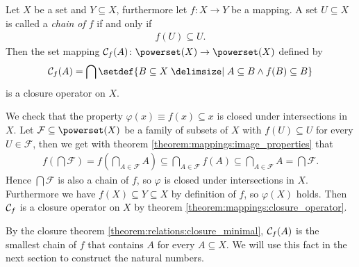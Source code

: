 \begin{examples}
    \begin{exampleenumerate}
        \item\label{example:mappings:chain_closure} Let $X$ be a set and $Y\subseteq X$, furthermore let $f\colon X\rightarrow Y$ be a mapping. A set $U\subseteq X$ is called a \emph{chain of $f$} if and only if \begin{align}f(U)\subseteq U.\end{align}
        Then the set mapping $\chainset_f(A)\colon \powerset(X)\rightarrow\powerset(X)$ defined by
        \begin{align}\chainset_f(A)=\bigcap\setdef{B\subseteq X\given A\subseteq B\land f(B)\subseteq B}\end{align}
        is a closure operator on $X$.
        \begin{miniproof}
            We check that the property $\varphi(x)\equiv f(x)\subseteq x$ is closed under intersections in $X$. Let $\mathcal F\subseteq\powerset(X)$ be a family of subsets of $X$ with $f(U)\subseteq U$ for every $U\in\mathcal F$, then we get with theorem \ref{theorem:mappings:image_properties} that
            \begin{align}f(\bigcap\mathcal F)=f(\bigcap_{A\in\mathcal F}A)\subseteq \bigcap_{A\in\mathcal F}f(A)\subseteq \bigcap_{A\in\mathcal F} A=\bigcap\mathcal F.\end{align}
            Hence $\bigcap\mathcal F$ is also a chain of $f$, so $\varphi$ is closed under intersections in $X$. Furthermore we have $f(X)\subseteq Y\subseteq X$ by definition of $f$, so $\varphi(X)$ holds. Then $\mathcal C_f$ is a closure operator on $X$ by theorem \ref{theorem:mappings:closure_operator}.
        \end{miniproof}
        By the closure theorem \ref{theorem:relations:closure_minimal}, $\mathcal C_f(A)$ is the smallest chain of $f$ that contains $A$ for every $A\subseteq X$. We will use this fact in the next section to construct the natural numbers.


\end{exampleenumerate}
\end{examples}
